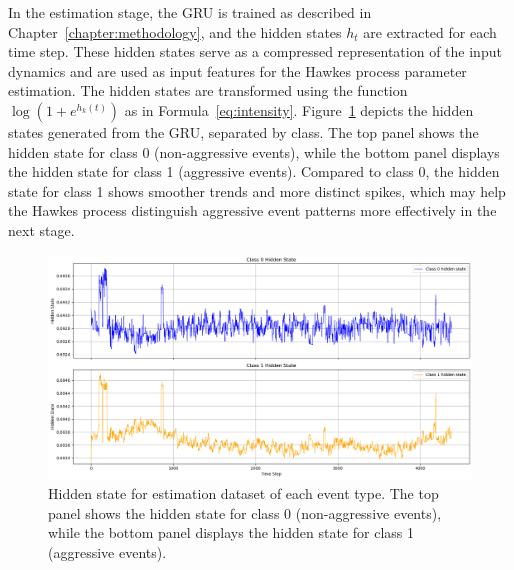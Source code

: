 In the estimation stage, the GRU is trained as described in Chapter~\ref{chapter:methodology}, and the hidden states $h_t$ are extracted for each time step. These hidden states serve as a compressed representation of the input dynamics and are used as input features for the Hawkes process parameter estimation. The hidden states are transformed using the function $\log(1 + e^{h_k(t)})$ as in Formula~\ref{eq:intensity}. Figure~\ref{fig:train-hidden-state} depicts the hidden states generated from the GRU, separated by class. The top panel shows the hidden state for class 0 (non-aggressive events), while the bottom panel displays the hidden state for class 1 (aggressive events). Compared to class 0, the hidden state for class 1 shows smoother trends and more distinct spikes, which may help the Hawkes process distinguish aggressive event patterns more effectively in the next stage.

\begin{figure}[H]
    \centering
    \includegraphics[width=0.95\linewidth]{figures/train-hidden-state.png}
    \caption{Hidden state for estimation dataset of each event type. The top panel shows the hidden state for class 0 (non-aggressive events), while the bottom panel displays the hidden state for class 1 (aggressive events).}
    \label{fig:train-hidden-state}
\end{figure}


